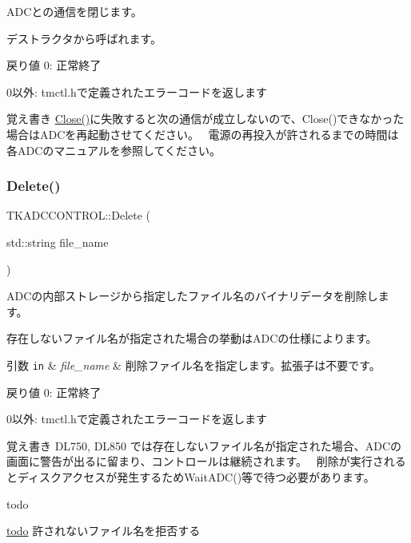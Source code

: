 A\+D\+Cとの通信を閉じます。

デストラクタから呼ばれます。 \begin{DoxyReturn}{戻り値}
0\+: 正常終了 

0以外\+: tmctl.\+hで定義されたエラーコードを返します 
\end{DoxyReturn}
\begin{DoxyNote}{覚え書き}
\hyperlink{class_t_k_a_d_c_c_o_n_t_r_o_l_a2f8903ef41b5b97ddf2d2f08a5374402}{Close()}に失敗すると次の通信が成立しないので、\+Close()できなかった場合は\+A\+D\+Cを再起動させてください。~\newline
 電源の再投入が許されるまでの時間は各\+A\+D\+Cのマニュアルを参照してください。 
\end{DoxyNote}
\mbox{\label{class_t_k_a_d_c_c_o_n_t_r_o_l_afa385509f61162198950676d279f4c3c}} 
\subsubsection{\texorpdfstring{Delete()}{Delete()}}
{\footnotesize\ttfamily T\+K\+A\+D\+C\+C\+O\+N\+T\+R\+O\+L\+::\+Delete (\begin{DoxyParamCaption}\item[{std\+::string}]{file\+\_\+name }\end{DoxyParamCaption})\hspace{0.3cm}{\ttfamily [virtual]}}

A\+D\+Cの内部ストレージから指定したファイル名のバイナリデータを削除します。

存在しないファイル名が指定された場合の挙動は\+A\+D\+Cの仕様によります。 
\begin{DoxyParams}[1]{引数}
\mbox{\tt in}  & {\em file\+\_\+name} & 削除ファイル名を指定します。拡張子は不要です。 \\
\hline
\end{DoxyParams}
\begin{DoxyReturn}{戻り値}
0\+: 正常終了 

0以外\+: tmctl.\+hで定義されたエラーコードを返します 
\end{DoxyReturn}
\begin{DoxyNote}{覚え書き}
D\+L750, D\+L850 では存在しないファイル名が指定された場合、\+A\+D\+Cの画面に警告が出るに留まり、コントロールは継続されます。~\newline
 削除が実行されるとディスクアクセスが発生するため\+Wait\+A\+D\+C()等で待つ必要があります。 
\end{DoxyNote}
\begin{DoxyRefDesc}{todo}
\item[\hyperlink{todo__todo000002}{todo}]許されないファイル名を拒否する \end{DoxyRefDesc}


